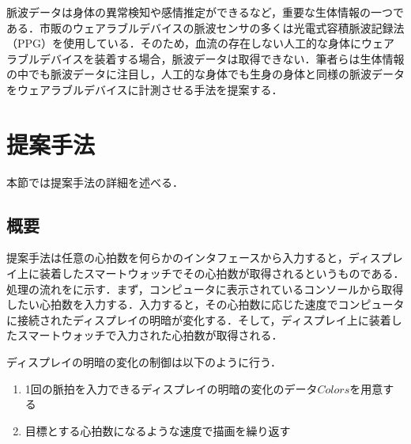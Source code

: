 \documentclass[Japanese,noauthor]{dicomopapers}
\begin{document}
脈波データは身体の異常検知や感情推定ができるなど，重要な生体情報の一つである．市販のウェアラブルデバイスの脈波センサの多くは光電式容積脈波記録法（PPG）を使用している．そのため，血流の存在しない人工的な身体にウェアラブルデバイスを装着する場合，脈波データは取得できない．筆者らは生体情報の中でも脈波データに注目し，人工的な身体でも生身の身体と同様の脈波データをウェアラブルデバイスに計測させる手法を提案する．



\section{提案手法}
\label{sec:method}
本節では提案手法の詳細を述べる．


\subsection{概要}
\label{subsec:overview}
提案手法は任意の心拍数を何らかのインタフェースから入力すると，ディスプレイ上に装着したスマートウォッチでその心拍数が取得されるというものである．処理の流れをに示す．まず，コンピュータに表示されているコンソールから取得したい心拍数を入力する．入力すると，その心拍数に応じた速度でコンピュータに接続されたディスプレイの明暗が変化する．そして，ディスプレイ上に装着したスマートウォッチで入力された心拍数が取得される．\par

ディスプレイの明暗の変化の制御は以下のように行う．
\begin{enumerate}
  \renewcommand{\labelenumi}{(\arabic{enumi})}
  \item 1回の脈拍を入力できるディスプレイの明暗の変化のデータ$Colors$を用意する
  \item 目標とする心拍数になるような速度で描画を繰り返す
\end{enumerate}
\end{document}
